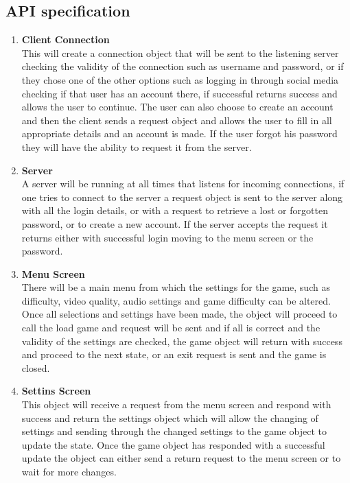 \documentclass[letterpaper]{article}
\begin{document}
			\vspace{0.2in}
			\subsection*{API specification}
			\vspace{0.1in}
						\begin{enumerate}
			\item \textbf{Client Connection}
			\\This will create a connection object that will be sent to the listening server checking the validity of the connection such as username and password, or if they chose one of the other options such as logging in through social media checking if that user has an account there, if successful returns success and allows the user to continue. The user can also choose to create an account and then the client sends a request object and allows the user to fill in all appropriate details and an account is made. If the user forgot his password they will have the ability to request it from the server.
			\item \textbf{Server}
			\\A server will be running at all times that listens for incoming connections, if one tries to connect to the server a request object is sent to the server along with all the login details, or with a request to retrieve a lost or forgotten password, or to create a new account. If the server accepts the request it returns either with successful login moving to the menu screen or the password.
			\item \textbf{Menu Screen}
			\\There will be a main menu from which the settings for the game, such as difficulty, video quality, audio settings and game difficulty can be altered. Once all selections and settings have been made, the object will proceed to call the load game and request will be sent and if all is correct and the validity of the settings are checked, the game object will return with success and proceed to the next state, or an exit request is sent and the game is closed.
			\item \textbf{Settins Screen}
			\\This object will receive a request from the menu screen and respond with success and return the settings object which will allow the changing of settings and sending through the changed settings to the game object to update the state. Once the game object has responded with a successful update the object can either send a return request to the menu screen or to wait for more changes.

\end{enumerate}
\end{document}
